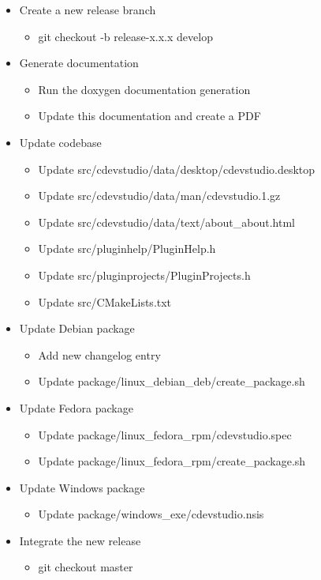 \documentclass{article}
\begin{document}
\begin{itemize}
	\item Create a new release branch
	\begin{itemize}
		\item git checkout -b release-x.x.x develop
	\end{itemize}
	\item Generate documentation
	\begin{itemize}
		\item Run the doxygen documentation generation
		\item Update this documentation and create a PDF
	\end{itemize}
	\item Update codebase
	\begin{itemize}
		\item Update src/cdevstudio/data/desktop/cdevstudio.desktop
		\item Update src/cdevstudio/data/man/cdevstudio.1.gz
		\item Update src/cdevstudio/data/text/about_about.html
		\item Update src/pluginhelp/PluginHelp.h
		\item Update src/pluginprojects/PluginProjects.h
		\item Update src/CMakeLists.txt
	\end{itemize}
	\item Update Debian package
	\begin{itemize}
		\item Add new changelog entry
		\item Update package/linux_debian_deb/create_package.sh
	\end{itemize}
	\item Update Fedora package
	\begin{itemize}
		\item Update package/linux_fedora_rpm/cdevstudio.spec
		\item Update package/linux_fedora_rpm/create_package.sh
	\end{itemize}
	\item Update Windows package
	\begin{itemize}
		\item Update package/windows_exe/cdevstudio.nsis
	\end{itemize}
	\item Integrate the new release
	\begin{itemize}
		\item git checkout master

\end{itemize}
\end{itemize}
\end{document}
